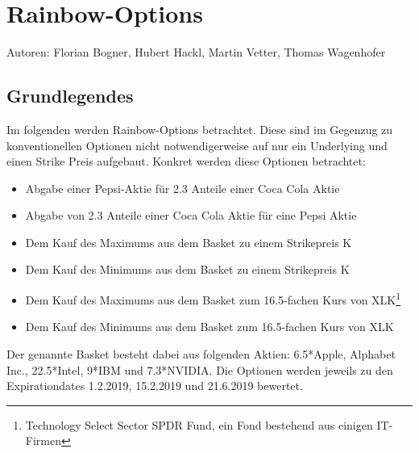 \documentclass[a4paper,12pt]{article}
\numberwithin[\arabic]{Satz}{section}
\begin{document}
	\section*{Rainbow-Options}
	Autoren: Florian Bogner, Hubert Hackl, Martin Vetter, Thomas Wagenhofer
		\subsection*{Grundlegendes}
			Im folgenden werden Rainbow-Options betrachtet. Diese sind im Gegenzug zu konventionellen Optionen nicht notwendigerweise auf nur ein Underlying und einen Strike Preis aufgebaut.
			\newline
			Konkret werden diese Optionen betrachtet:
			\begin{itemize}
				\item Abgabe einer Pepsi-Aktie für 2.3 Anteile einer Coca Cola Aktie
				\item Abgabe von 2.3 Anteile einer Coca Cola Aktie für eine Pepsi Aktie
				\item Dem Kauf des Maximums aus dem Basket zu einem Strikepreis K
				\item Dem Kauf des Minimums aus dem Basket zu einem Strikepreis K
				\item Dem Kauf des Maximums aus dem Basket zum 16.5-fachen Kurs von XLK\footnote{Technology Select Sector SPDR Fund, ein Fond bestehend aus einigen IT-Firmen}
				\item Dem Kauf des Minimums aus dem Basket zum 16.5-fachen Kurs von XLK
			\end{itemize}
			Der genannte Basket besteht dabei aus folgenden Aktien: 6.5*Apple, Alphabet Inc., 22.5*Intel, 9*IBM und 7.3*NVIDIA.
			Die Optionen werden jeweils zu den Expirationdates 1.2.2019, 15.2.2019 und 21.6.2019 bewertet.
\end{document}
